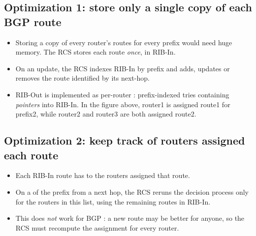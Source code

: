 
\subsection{Optimization 1: store only a single copy of each BGP route}
\begin{itemize}
\item Storing a copy of every router's routes for every prefix would need huge memory. The RCS stores each route \emph{once}, in RIB-In.
\item On an update, the RCS indexes RIB-In by prefix and adds, updates or removes the route identified by its next-hop.
\item RIB-Out is implemented as per-router : prefix-indexed tries containing \emph{pointers} into RIB-In. In the figure above, router1 is assigned route1 for prefix2, while router2 and router3 are both assigned route2.
\end{itemize}

\subsection{Optimization 2: keep track of routers assigned each route}
\begin{itemize}
\item Each RIB-In route has  to the routers assigned that route.
\item On a  of the prefix from a next hop, the RCS reruns the decision process only for the routers in this list, using the remaining routes in RIB-In.
\item This does \emph{not} work for BGP : a new route may be better for anyone, so the RCS must recompute the assignment for every router.
\end{itemize}

